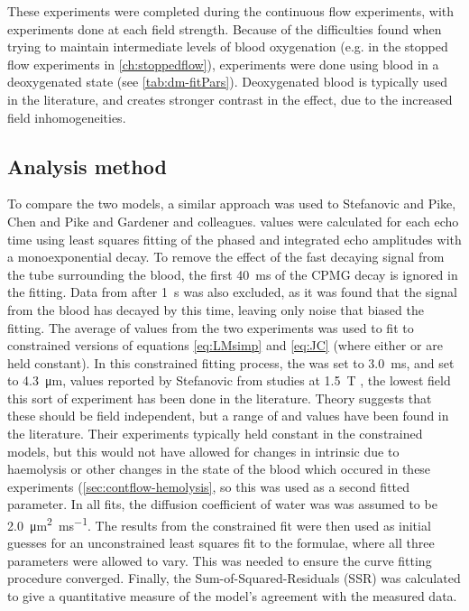 These experiments were completed during the continuous flow experiments, with experiments done at each field strength.
Because of the difficulties found when trying to maintain intermediate levels of blood oxygenation (e.g. in the stopped flow experiments in \autoref{ch:stoppedflow}), experiments were done using blood in a deoxygenated state (see \autoref{tab:dm-fitPars}).
Deoxygenated blood is typically used in the literature, and creates stronger contrast in the \Ttwo effect, due to the increased field inhomogeneities.

\subsection*{Analysis method}
To compare the two models, a similar approach was used to Stefanovic and Pike\cite{StefanovicHumanwholebloodrelaxometry2004}, Chen and Pike \cite{ChenHumanwholeblood2009} and Gardener and colleagues\cite{GardenerDependencebloodR22010}.
\Ttwo values were calculated for each echo time using least squares fitting of the phased and integrated echo amplitudes with a monoexponential decay.
To remove the effect of the fast decaying signal from the tube surrounding the blood, the first \SI{40}{ms} of the CPMG decay is ignored in the fitting.
Data from after \SI{1}{\second} was also excluded, as it was found that the signal from the blood has decayed by this time, leaving only noise that biased the fitting.
The average of \Ttwo values from the two experiments was used to fit to constrained versions of equations \ref{eq:LMsimp} and \ref{eq:JC} (where either \Texc or \rc are held constant).
In this constrained fitting process, the \Texc was set to \SI{3.0}{ms}, and \rc set to \SI{4.3}{\micro\metre}, values reported by Stefanovic from studies at \SI{1.5}{T} \cite{StefanovicHumanwholebloodrelaxometry2004}, the lowest field this sort of experiment has been done in the literature.
Theory suggests that these should be field independent, but a range of \Texc and \rc values have been found in the literature.
Their experiments typically held \TtwoO constant in the constrained models, but this would not have allowed for changes in intrinsic \Ttwo due to haemolysis or other changes in the state of the blood which occured in these experiments (\autoref{sec:contflow-hemolysis}, so this was used as a second fitted parameter.
In all fits, the diffusion coefficient of water was was assumed to be \SI[per-mode=reciprocal]{2.0}{\micro\metre\squared\per\milli\second}.
The results from the constrained fit were then used as initial guesses for an unconstrained least squares fit to the formulae, where all three parameters were allowed to vary.
This was needed to ensure the curve fitting procedure converged.
Finally, the Sum-of-Squared-Residuals (SSR) was calculated to give a quantitative measure of the model's agreement with the measured data.


